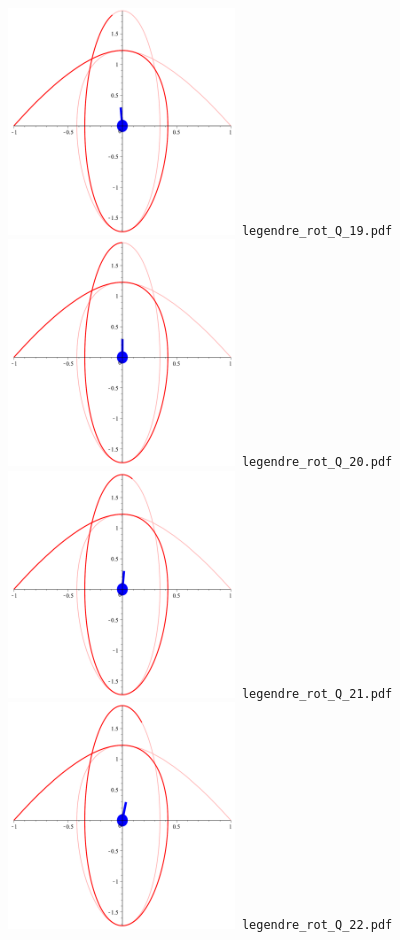 \documentclass[a4paper]{amsart}
\begin{document}
\includegraphics[width=6cm]{legendre_rot_Q_19.pdf}\verb+ legendre_rot_Q_19.pdf+\\
\includegraphics[width=6cm]{legendre_rot_Q_20.pdf}\verb+ legendre_rot_Q_20.pdf+\\
\includegraphics[width=6cm]{legendre_rot_Q_21.pdf}\verb+ legendre_rot_Q_21.pdf+\\
\includegraphics[width=6cm]{legendre_rot_Q_22.pdf}\verb+ legendre_rot_Q_22.pdf+\\
\end{document}
